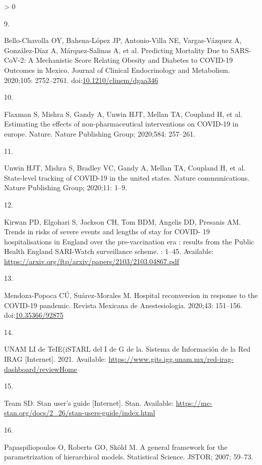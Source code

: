 \documentclass[10pt,letterpaper]{article}
\newlength{\csllabelwidth}
\newlength{\cslhangindent}
\newenvironment{CSLReferences}[3] %
 {%
  \setlength{\parindent}{0pt}
  \ifodd #1 \everypar{\setlength{\hangindent}{\cslhangindent}}\ignorespaces\fi
  \ifnum #2 > 0
  \setlength{\parskip}{#2\baselineskip}
  \fi
 }%
 {}
\newcommand{\CSLLeftMargin}[1]{\parbox[t]{\csllabelwidth}{#1}}
\newcommand{\CSLRightInline}[1]{\parbox[t]{\linewidth - \csllabelwidth}{#1}}
\begin{document}
\begin{CSLReferences}{0}{0}
\leavevmode\hypertarget{ref-Bello-Chavolla2020}{}%
\CSLLeftMargin{9. }
\CSLRightInline{Bello-Chavolla OY, Bahena-López JP, Antonio-Villa NE,
Vargas-Vázquez A, González-Díaz A, Márquez-Salinas A, et al. {Predicting
Mortality Due to SARS-CoV-2: A Mechanistic Score Relating Obesity and
Diabetes to COVID-19 Outcomes in Mexico}. Journal of Clinical
Endocrinology and Metabolism. 2020;105: 2752--2761.
doi:\href{https://doi.org/10.1210/clinem/dgaa346}{10.1210/clinem/dgaa346}}

\leavevmode\hypertarget{ref-flaxman2020estimating}{}%
\CSLLeftMargin{10. }
\CSLRightInline{Flaxman S, Mishra S, Gandy A, Unwin HJT, Mellan TA,
Coupland H, et al. Estimating the effects of non-pharmaceutical
interventions on COVID-19 in europe. Nature. Nature Publishing Group;
2020;584: 257--261. }

\leavevmode\hypertarget{ref-unwin2020state}{}%
\CSLLeftMargin{11. }
\CSLRightInline{Unwin HJT, Mishra S, Bradley VC, Gandy A, Mellan TA,
Coupland H, et al. State-level tracking of COVID-19 in the united
states. Nature communications. Nature Publishing Group; 2020;11: 1--9. }

\leavevmode\hypertarget{ref-Kirwan}{}%
\CSLLeftMargin{12. }
\CSLRightInline{Kirwan PD, Elgohari S, Jackson CH, Tom BDM, Angelis DD,
Presanis AM. {Trends in risks of severe events and lengths of stay for
COVID- 19 hospitalisations in England over the pre-vaccination era :
results from the Public Health England SARI-Watch surveillance scheme}.
: 1--45. Available:
\url{https://arxiv.org/ftp/arxiv/papers/2103/2103.04867.pdf}}

\leavevmode\hypertarget{ref-Mendoza-Popoca2020}{}%
\CSLLeftMargin{13. }
\CSLRightInline{Mendoza-Popoca CÚ, Suárez-Morales M. {Hospital
reconversion in response to the COVID-19 pandemic}. Revista Mexicana de
Anestesiologia. 2020;43: 151--156.
doi:\href{https://doi.org/10.35366/92875}{10.35366/92875}}

\leavevmode\hypertarget{ref-UNAM2021}{}%
\CSLLeftMargin{14. }
\CSLRightInline{UNAM LI de TeIE(iSTARL del I de G de la. {Sistema de
Informaci{ó}n de la Red IRAG} {[}Internet{]}. 2021. Available:
\url{https://www.gits.igg.unam.mx/red-irag-dashboard/reviewHome}}

\leavevmode\hypertarget{ref-stanmanual}{}%
\CSLLeftMargin{15. }
\CSLRightInline{Team SD. Stan user's guide {[}Internet{]}. Stan.
Available:
\url{https://mc-stan.org/docs/2_26/stan-users-guide/index.html}}

\leavevmode\hypertarget{ref-papaspiliopoulos2007general}{}%
\CSLLeftMargin{16. }
\CSLRightInline{Papaspiliopoulos O, Roberts GO, Sköld M. A general
framework for the parametrization of hierarchical models. Statistical
Science. JSTOR; 2007; 59--73. }


\end{CSLReferences}
\end{document}
